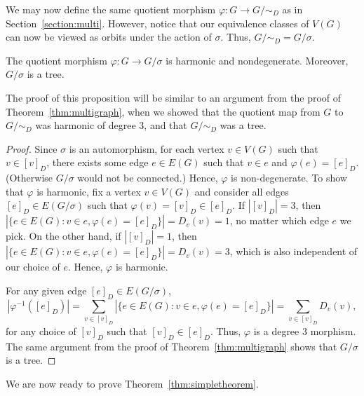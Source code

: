 \documentclass[ALCO,ThmDefs,Unicode,epreuves]{cedram}
\begin{document}
We may now define the same quotient morphism $\varphi: G \to G / \sim_D$ as in Section~\ref{section:multi}. However, notice that our equivalence classes of $V(G)$ can now be viewed as orbits under the action of $\sigma$. Thus, $G / \sim_D = G / \sigma$. 



\begin{prop}
\label{prop:quotient}
The quotient morphism $\varphi: G \to G / \sigma$ is harmonic and nondegenerate. Moreover, $G/\sigma$ is a tree.
\end{prop}

The proof of this proposition will be similar to an argument from the proof of Theorem~\ref{thm:multigraph}, when we showed that the quotient map from $G$ to $G/\sim_D$ was harmonic of degree $3$, and that $G/\sim_D$ was a tree.

\begin{proof} Since $\sigma$ is an automorphism, for each vertex $v \in V(G)$ such that $v \in [v]_D$, there exists some edge $e \in E(G)$ such that $v \in e$ and $\varphi(e) = [e]_D$. (Otherwise $G/\sigma$ would not be connected.) Hence, $\varphi$ is non-degenerate. To show that $\varphi$ is harmonic, fix a vertex $v \in V(G)$ and consider all edges $[e]_D \in E(G/\sigma)$ such that $\varphi(v) = [v]_D \in [e]_D$. If $\left| [v]_D \right| = 3$, then $| \{e \in E(G) : v \in e, \varphi(e) = [e]_D \}| = D_v(v) = 1$, no matter which edge $e$ we pick. On the other hand, if $\left| [v]_D \right| = 1$, then $| \{e \in E(G) : v \in e, \varphi(e) = [e]_D \}| = D_v(v) = 3$, which is also independent of our choice of $e$. Hence, $\varphi$ is harmonic. 

For any given edge $[e]_D \in E(G/\sigma)$, 
\[
|\varphi^{-1}([e]_D)| = \sum_{v \in [v]_D} |\{ e \in E(G) : v \in e, \varphi(e) = [e]_D \}| = \sum_{v \in [v]_D} D_v(v),
\]
for any choice of $[v]_D$ such that $[v]_D \in [e]_D$. Thus, $\varphi$ is a degree $3$ morphism. The same argument from the proof of Theorem~\ref{thm:multigraph} shows that $G / \sigma$ is a tree. 
\end{proof}



We are now ready to prove Theorem~\ref{thm:simpletheorem}.
\end{document}
